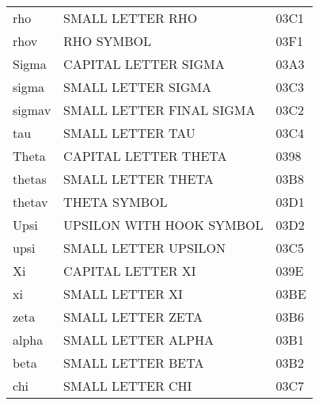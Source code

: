 \begin{latin}
\begin{longtable}{@{}lll}
rho                &  SMALL LETTER RHO              & 03C1\\
rhov               &  RHO SYMBOL                    & 03F1\\
Sigma              &  CAPITAL LETTER SIGMA          & 03A3\\
sigma              &  SMALL LETTER SIGMA            & 03C3\\
sigmav             &  SMALL LETTER FINAL SIGMA      & 03C2\\
tau                &  SMALL LETTER TAU              & 03C4\\
Theta              &  CAPITAL LETTER THETA          & 0398\\
thetas             &  SMALL LETTER THETA            & 03B8\\
thetav             &  THETA SYMBOL                  & 03D1\\
Upsi               &  UPSILON WITH HOOK SYMBOL      & 03D2\\
upsi               &  SMALL LETTER UPSILON          & 03C5\\
Xi                 &  CAPITAL LETTER XI             & 039E\\
xi                 &  SMALL LETTER XI               & 03BE\\
zeta               &  SMALL LETTER ZETA             & 03B6\\
%
%
%
alpha              &  SMALL LETTER ALPHA            & 03B1\\
beta               &  SMALL LETTER BETA             & 03B2\\
chi                &  SMALL LETTER CHI              & 03C7\\


\end{longtable}
\end{latin}
